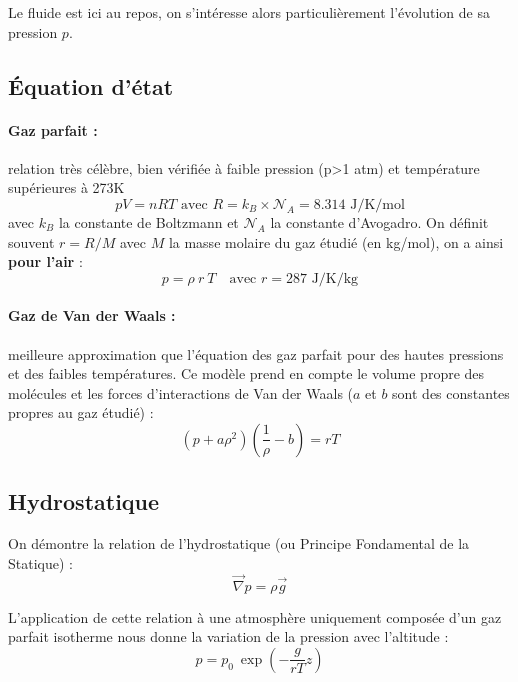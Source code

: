 
Le fluide est ici au repos, on s'intéresse alors particulièrement l'évolution de sa pression $p$.


\subsection{Équation d'état}
\paragraph{Gaz parfait :}relation très célèbre, bien vérifiée à faible pression (p>1 atm) et température supérieures à 273K
%
\begin{equation}
pV = nRT \text{ avec } R = k_B \times \mathcal{N}_A = 8.314 \text{ J/K/mol}
\end{equation}
%
avec $k_B$ la constante de Boltzmann et $\mathcal{N}_A$ la constante d'Avogadro. On définit souvent $r = R/M$ avec $M$ la masse molaire du gaz étudié (en kg/mol), on a ainsi \textbf{pour l'air} :
%
\begin{equation}
p = \rho~r~T \quad\text{avec } r = 287 \text{ J/K/kg}
\end{equation}

\paragraph{Gaz de Van der Waals :}meilleure approximation que l'équation des gaz parfait pour des hautes pressions et des faibles températures. Ce modèle prend en compte le volume propre des molécules et les forces d'interactions de Van der Waals ($a$ et $b$ sont des constantes propres au gaz étudié) :
%
\begin{equation}
\left( p + a\rho^2 \right) \left( \frac{1}{\rho} - b \right) = rT
\end{equation}


\subsection{Hydrostatique}
On démontre la relation de l'hydrostatique (ou Principe Fondamental de la Statique) :
%
\begin{equation}
\vec{\nabla} p = \rho \vec{g}
\label{eq:PFS}
\end{equation}

L'application de cette relation à une atmosphère uniquement composée d'un gaz parfait isotherme nous donne la variation de la pression avec l'altitude :
%
\begin{equation}
    p = p_0~\exp{\left( -\frac{g}{rT}z \right)}
\end{equation}

